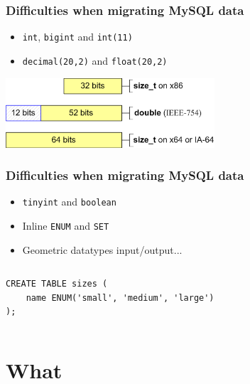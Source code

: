 \documentclass{beamer}
\begin{document}
\begin{frame}[fragile]
  \frametitle{Difficulties when migrating MySQL data}
  
  \vfill

  \begin{itemize}
  \item \texttt{int}, \texttt{bigint} and \texttt{int(11)}
  \item \texttt{decimal(20,2)} and \texttt{float(20,2)}
  \end{itemize}
  \vfill

\begin{center}
  \includegraphics[height=7em]{int-bigint.png}
\end{center}
\end{frame}

\begin{frame}[fragile]
  \frametitle{Difficulties when migrating MySQL data}
  
  \vfill

  \begin{itemize}
  \item \texttt{tinyint} and \texttt{boolean}
  \item Inline \texttt{ENUM} and \texttt{SET}
  \item Geometric datatypes input/output...
  \end{itemize}

\begin{columns}
\begin{verbatim}
CREATE TABLE sizes (
    name ENUM('small', 'medium', 'large')
);
\end{verbatim}
\end{columns}
\end{frame}

\section{What}
\end{document}
